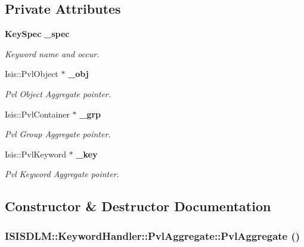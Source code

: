 \subsection*{Private Attributes}
\begin{CompactItemize}
\item 
{\bf Key\-Spec} {\bf \_\-spec}
\begin{CompactList}\small\item\em Keyword name and occur. \item\end{CompactList}\item 
Isis::Pvl\-Object $\ast$ {\bf \_\-obj}
\begin{CompactList}\small\item\em Pvl Object Aggregate pointer. \item\end{CompactList}\item 
Isis::Pvl\-Container $\ast$ {\bf \_\-grp}
\begin{CompactList}\small\item\em Pvl Group Aggregate pointer. \item\end{CompactList}\item 
Isis::Pvl\-Keyword $\ast$ {\bf \_\-key}
\begin{CompactList}\small\item\em Pvl Keyword Aggregate pointer. \item\end{CompactList}\end{CompactItemize}


\subsection{Constructor \& Destructor Documentation}
\subsubsection{\setlength{\rightskip}{0pt plus 5cm}ISISDLM::Keyword\-Handler::Pvl\-Aggregate::Pvl\-Aggregate ()\hspace{0.3cm}{\tt  [inline]}}\label{classISISDLM_1_1KeywordHandler_1_1PvlAggregate_a0}


